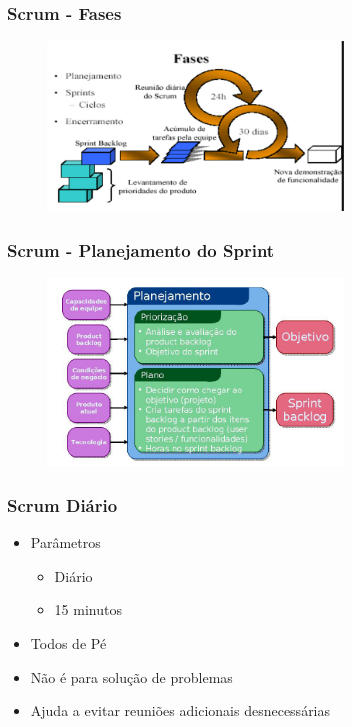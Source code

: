 \begin{frame}
 \frametitle{Scrum - Fases}
 \begin{figure}
  \centering
  \includegraphics[width = 0.7\textwidth]{figs/fig1_5.png}
 \end{figure}
\end{frame}

\begin{frame}
 \frametitle{Scrum - Planejamento do Sprint}
 \begin{figure}
  \centering
  \includegraphics[width = 0.7\textwidth]{figs/fig1_6.png}
 \end{figure}
\end{frame}

\begin{frame}
 \frametitle{Scrum Diário}
 \begin{itemize}
  \item Parâmetros
  \begin{itemize}
   \item Diário
   \item 15 minutos
  \end{itemize}
  \item Todos de Pé
  \item Não é para solução de problemas
  \item Ajuda a evitar reuniões adicionais desnecessárias
 \end{itemize}
\end{frame}

